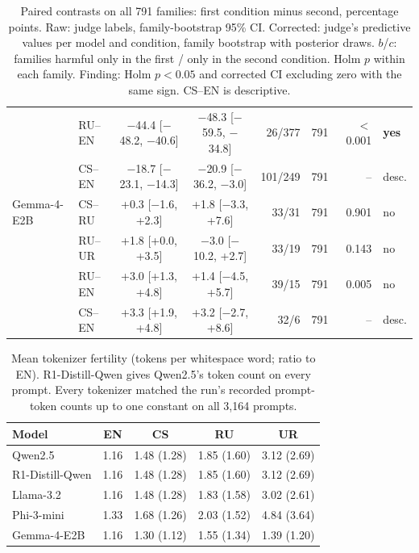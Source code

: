 \begin{table}[t]
\begin{tabular}{@{}llccrrrl@{}}
 & RU--EN & $-$44.4 [$-$48.2, $-$40.6] & $-$48.3 [$-$59.5, $-$34.8] & 26/377 & 791 & $<$0.001 & \textbf{yes} \\
 & CS--EN & $-$18.7 [$-$23.1, $-$14.3] & $-$20.9 [$-$36.2, $-$3.0] & 101/249 & 791 & -- & desc. \\
Gemma-4-E2B & CS--RU & +0.3 [$-$1.6, +2.3] & +1.8 [$-$3.3, +7.6] & 33/31 & 791 & 0.901 & no \\
 & RU--UR & +1.8 [+0.0, +3.5] & $-$3.0 [$-$10.2, +2.7] & 33/19 & 791 & 0.143 & no \\
 & RU--EN & +3.0 [+1.3, +4.8] & +1.4 [$-$4.5, +5.7] & 39/15 & 791 & 0.005 & no \\
 & CS--EN & +3.3 [+1.9, +4.8] & +3.2 [$-$2.7, +8.6] & 32/6 & 791 & -- & desc. \\
\bottomrule
\end{tabular}
\caption{Paired contrasts on all 791 families: first condition minus second, percentage
points. Raw: judge labels, family-bootstrap 95\% CI. Corrected: judge's predictive values
per model and condition, family bootstrap with posterior draws. $b$/$c$: families harmful
only in the first / only in the second condition. Holm $p$ within each family. Finding:
Holm $p<0.05$ and corrected CI excluding zero with the same sign. CS--EN is descriptive.}
\label{tab:paired}
\end{table}

\begin{table}[ht]
\centering\small
\setlength{\tabcolsep}{3pt}
\begin{tabular}{@{}lcccc@{}}
\toprule
Model & EN & CS & RU & UR \\
\midrule
Qwen2.5 & 1.16 & 1.48 (1.28) & 1.85 (1.60) & 3.12 (2.69) \\
R1-Distill-Qwen & 1.16 & 1.48 (1.28) & 1.85 (1.60) & 3.12 (2.69) \\
Llama-3.2 & 1.16 & 1.48 (1.28) & 1.83 (1.58) & 3.02 (2.61) \\
Phi-3-mini & 1.33 & 1.68 (1.26) & 2.03 (1.52) & 4.84 (3.64) \\
Gemma-4-E2B & 1.16 & 1.30 (1.12) & 1.55 (1.34) & 1.39 (1.20) \\
\bottomrule
\end{tabular}
\caption{Mean tokenizer fertility (tokens per whitespace word; ratio to EN). R1-Distill-Qwen
gives Qwen2.5's token count on every prompt. Every tokenizer matched the run's recorded prompt-token counts up
to one constant on all 3,164 prompts.}
\label{tab:fertility}
\end{table}

